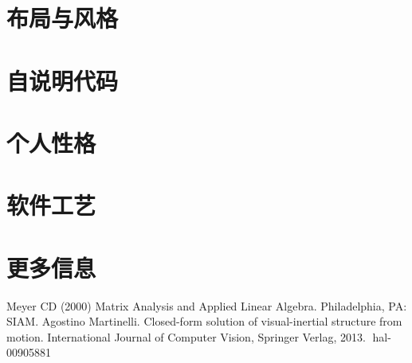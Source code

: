 \documentclass{article}
\begin{document}
\section{布局与风格}

\section{自说明代码}

\section{个人性格}

\section{软件工艺}

\section{更多信息}


\begin{thebibliography}{99}  
    Meyer CD (2000) Matrix Analysis and Applied Linear Algebra. Philadelphia, PA: SIAM.
     Agostino Martinelli. Closed-form solution of visual-inertial structure from motion. International
    Journal of Computer Vision, Springer Verlag, 2013. ￿hal-00905881
\end{thebibliography}
\end{document}
